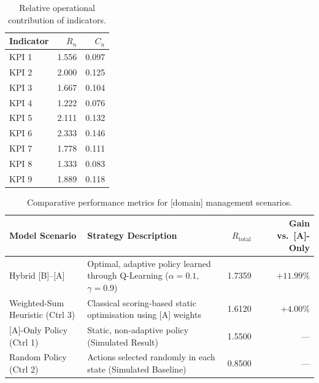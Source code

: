 \documentclass[10pt,twocolumn]{article}
\newcommand{\tabfont}{\fontsize{8.5}{10.5}\selectfont}
\begin{document}
\begin{table}[H]
\caption{Relative operational contribution of indicators.}
\label{tab:contribution}
\tabfont
\setlength{\tabcolsep}{6pt}
\begin{tabularx}{\columnwidth}{Xrr}
\toprule
\textbf{Indicator} & $R_n$ & $C_n$ \\
\midrule
KPI 1 & 1.556 & 0.097 \\
KPI 2 & 2.000 & 0.125 \\
KPI 3 & 1.667 & 0.104 \\
KPI 4 & 1.222 & 0.076 \\
KPI 5 & 2.111 & 0.132 \\
KPI 6 & 2.333 & 0.146 \\
KPI 7 & 1.778 & 0.111 \\
KPI 8 & 1.333 & 0.083 \\
KPI 9 & 1.889 & 0.118 \\
\bottomrule
\end{tabularx}
\end{table}

\begin{table}[ht]
\caption{Comparative performance metrics for [domain] management scenarios.}
\label{tab:comparison}
\tabfont
\setlength{\tabcolsep}{5pt}
\renewcommand{\arraystretch}{1.15}
\begin{tabular}{p{3.8cm}p{7.8cm}rr}
\toprule
\textbf{Model Scenario} & \textbf{Strategy Description}
  & \textbf{$R_{\mathrm{total}}$}
  & \textbf{Gain vs.\ [A]-Only} \\
\midrule
Hybrid [B]--[A]
  & Optimal, adaptive policy learned through Q-Learning
    ($\alpha=0.1$, $\gamma=0.9$)
  & 1.7359 & $+11.99\%$ \\
Weighted-Sum Heuristic (Ctrl 3)
  & Classical scoring-based static optimisation using [A] weights
  & 1.6120 & $+4.00\%$ \\
{[A]-Only Policy (Ctrl 1)}
  & Static, non-adaptive policy (Simulated Result)
  & 1.5500 & --- \\
Random Policy (Ctrl 2)
  & Actions selected randomly in each state (Simulated Baseline)
  & 0.8500 & --- \\
\bottomrule
\end{tabular}
\end{table}
\end{document}
